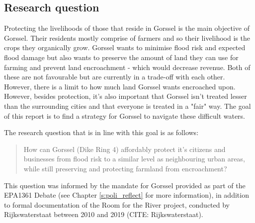 

\subsection{Research question}

Protecting the livelihoods of those that reside in Gorssel is the main objective of Gorssel. Their residents mostly comprise of farmers and so their livelihood is the crops they organically grow. Gorssel wants to minimise flood risk and expected flood damage but also wants to preserve the amount of land they can use for farming and prevent land encroachment - which would decrease revenue. Both of these are not favourable but are currently in a trade-off with each other. However, there is a limit to how much land Gorssel wants encroached upon. However, besides protection, it's also important that Gorssel isn't treated lesser than the surrounding cities and that everyone is treated in a "fair" way. 
The goal of this report is to find a strategy for Gorssel to navigate these difficult waters. 


The research question that is in line with this goal is as follows: 
\begin{quote}
    How can Gorssel (Dike Ring 4) affordably protect it's citizens and businesses from flood risk to a similar level as neighbouring urban areas, while still preserving and protecting farmland from encroachment?
\end{quote}

This question was informed by the mandate for Gorssel provided as part of the EPA1361 Debate (see Chapter \ref{s:poli_reflect} for more information), in addition to formal documentation of the Room for the River project, conducted by Rijkswaterstaat between 2010 and 2019 (CITE: Rijkswaterstaat).

